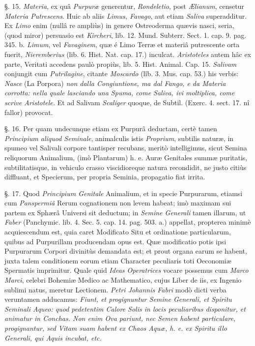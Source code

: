 \documentclass[a4paper, 11pt, oneside, polutonikogreek, german]{article}
\begin{document}
§. 15. \emph{Materia}, ex quâ \emph{Purpuræ} generentur, \emph{Rondeletio}, post \emph{Ælianum}, censetur \emph{Materia Putrescens}. Huic ab aliis \emph{Limus, Favago}, aut etiam \emph{Saliva} superadditur. Ex \emph{Limo} enim (nullâ re ampliùs) in genere Ostreoderma quævis nasci, seria, (quod miror) persuasio est \emph{Kircheri}, lib. 12. Mund. Subterr. Sect. 1. cap. 9. pag. 345. b. \emph{Limum}, vel \emph{Favaginem}, quæ é Limo Terræ et materiâ putrescente orta fuerit, \emph{Nieremberius} (lib. 6. Hist. Nat. cap. 17.) inculcat. \emph{Aristoteles} autem hâc ex parte, Veritati accedens paulò propiùs, lib. 5. Hist. Animal. Cap. 15. \emph{Salivam} conjungit cum \emph{Putrilagine}, citante \emph{Moscardo} (lîb. 3. Mus. cap. 53.) his verbis: \emph{Nasce} (La Porpora) \emph{non dalla Congiuntione, ma dal Fango, e da Materia corrotta: nella quale lasciando una Spuma, come Saliva, ivi moltiplica, come scrive Aristotele.} Et ad Salivam \emph{Scaliger} quoque, de Subtil. (Exerc. 4. sect. 17. nî fallor) provocat.

§. 16. Per quam undecunque etiam ex Purpurâ deductam, certè tamen \emph{Principium aliquod Seminale}, animalculis istis \emph{Proprium}, subtilis naturæ, in spumeo vel Salivali corpore tantisper recubans, meritò intelligimus, sicut Semina reliquorum Animalium, (imò Plantarum) h. e. Auræ Genitales summæ puritatis, subtilitatisque, in vehiculo crasso viscidioreque natura recondidit, ne justo citiùs diffluant, et Specierum, per propria Seminia, propagatio fiat irrita.

§. 17. Quod \emph{Principium Genitale} Animalium, et in specie Purpurarum, etiamsi cum \emph{Panspermiâ} Rerum cognationem non levem habeat; imò maximam sui partem ex Sphærâ Universi sit deductum; in \emph{Semine Generali} tamen illarum, ut \emph{Faber} (Panchymic. lib. 4. Sec. 5. cap. 14. pag. 503. a.) appellat, propterea minimè acquiescendum est, quia caret Modificato Situ et ordinatione particularum, quibus ad Purpurillam producendam opus est. Quæ modificatio potis ipsi Purpurarum Corpori divinitùs demandata est; et prout organa earum se habent, juxta talem conditionem eorum etiam Character peculiaris toti Oeconomiæ Spermatis imprimitur. Quale quid \emph{Ideas Operatrices} vocare possemus cum \emph{Marco Marci}, celebri Bohemiæ Medico ac Mathematico, cujus Liber de iis, ex Ingenio sublimi natus, meretur Lectionem. \emph{Petri Johannis Fabri} modò dicti verba veruntamen adducamus: \emph{Fiunt, et progignuntur Semine Generali, et Spiritu Seminali Aqueo: quod pedetentim Calore Solis in locis peculiaribus disponitur, et animatur in Conchas. Non enim Ova pariunt, nec Semen habent particulare, progignantur, sed Vitam suam habent ex Chaos Aquæ, h. e. ex Spiritu illo Generali, qui Aquis incubat, etc.}
\end{document}
